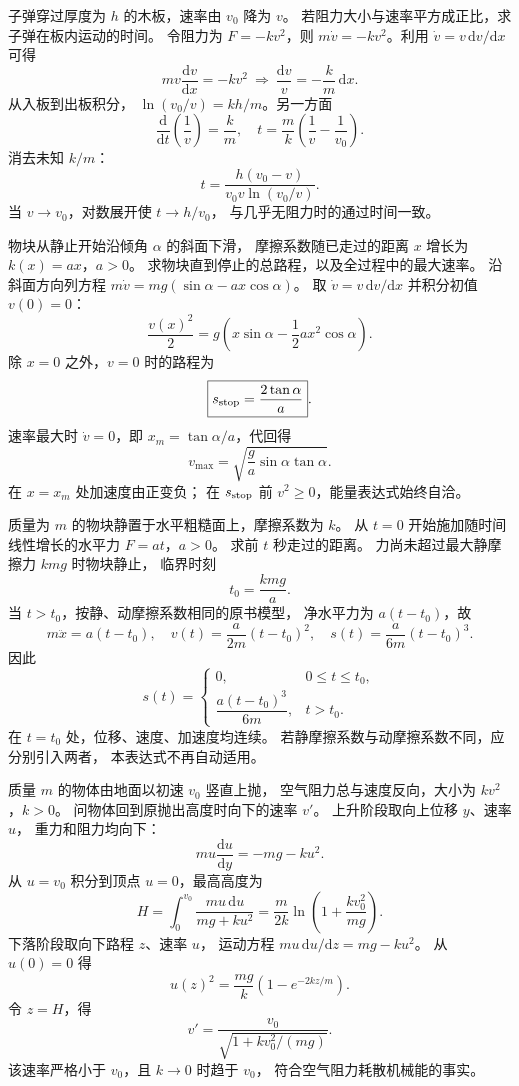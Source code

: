 子弹穿过厚度为 $h$ 的木板，速率由 $v_0$ 降为 $v$。
若阻力大小与速率平方成正比，求子弹在板内运动的时间。
\exsolution
令阻力为 $F=-kv^2$，则
$m\dot v=-kv^2$。利用
$\dot v=v\,\mathrm dv/\mathrm dx$ 可得
\[
m v\frac{\mathrm dv}{\mathrm dx}=-kv^2
\ \Longrightarrow\
\frac{\mathrm dv}{v}=-\frac km\,\mathrm dx.
\]
从入板到出板积分，
$\ln(v_0/v)=kh/m$。另一方面
\[
\frac{\mathrm d}{\mathrm dt}\left(\frac1v\right)=\frac km,
\quad
t=\frac mk\left(\frac1v-\frac1{v_0}\right).
\]
消去未知 $k/m$：
\[
\boxed{t=\frac{h(v_0-v)}
 {v_0v\ln(v_0/v)}}.
\]
\excheck 当 $v\to v_0$，对数展开使 $t\to h/v_0$，
与几乎无阻力时的通过时间一致。

物块从静止开始沿倾角 $\alpha$ 的斜面下滑，
摩擦系数随已走过的距离 $x$ 增长为 $k(x)=ax$，$a>0$。
求物块直到停止的总路程，以及全过程中的最大速率。
\exsolution
沿斜面方向列方程
$m\dot v=mg(\sin\alpha-ax\cos\alpha)$。
取 $\dot v=v\,\mathrm dv/\mathrm dx$ 并积分初值 $v(0)=0$：
\[
\frac{v(x)^2}{2}
=g\left(x\sin\alpha-\frac12ax^2\cos\alpha\right).
\]
除 $x=0$ 之外，$v=0$ 时的路程为
\[
\boxed{s_{\rm stop}=\frac{2\tan\alpha}{a}}.
\]
速率最大时 $\dot v=0$，即
$x_m=\tan\alpha/a$，代回得
\[
\boxed{v_{\max}=
\sqrt{\frac ga\sin\alpha\tan\alpha}}.
\]
\excheck 在 $x=x_m$ 处加速度由正变负；
在 $s_{\rm stop}$ 前 $v^2\ge0$，能量表达式始终自洽。

质量为 $m$ 的物块静置于水平粗糙面上，摩擦系数为 $k$。
从 $t=0$ 开始施加随时间线性增长的水平力 $F=at$，$a>0$。
求前 $t$ 秒走过的距离。
\exsolution
力尚未超过最大静摩擦力 $kmg$ 时物块静止，
临界时刻
\[
t_0=\frac{kmg}{a}.
\]
当 $t>t_0$，按静、动摩擦系数相同的原书模型，
净水平力为 $a(t-t_0)$，故
\[
m\ddot x=a(t-t_0),\quad
v(t)=\frac{a}{2m}(t-t_0)^2,\quad
s(t)=\frac{a}{6m}(t-t_0)^3.
\]
因此
\[
\boxed{s(t)=
\begin{cases}
0,&0\le t\le t_0,\\[2pt]
\dfrac{a(t-t_0)^3}{6m},&t>t_0.
\end{cases}}
\]
\excheck 在 $t=t_0$ 处，位移、速度、加速度均连续。
若静摩擦系数与动摩擦系数不同，应分别引入两者，
本表达式不再自动适用。

质量 $m$ 的物体由地面以初速 $v_0$ 竖直上抛，
空气阻力总与速度反向，大小为 $kv^2$，$k>0$。
问物体回到原抛出高度时向下的速率 $v'$。
\exsolution
上升阶段取向上位移 $y$、速率 $u$，
重力和阻力均向下：
\[
m u\frac{\mathrm du}{\mathrm dy}=-mg-ku^2.
\]
从 $u=v_0$ 积分到顶点 $u=0$，最高高度为
\[
H=\int_0^{v_0}\frac{mu\,\mathrm du}{mg+ku^2}
=\frac{m}{2k}\ln\left(1+\frac{kv_0^2}{mg}\right).
\]
下落阶段取向下路程 $z$、速率 $u$，
运动方程 $m u\,\mathrm du/\mathrm dz=mg-ku^2$。
从 $u(0)=0$ 得
\[
u(z)^2=\frac{mg}{k}\left(1-e^{-2kz/m}\right).
\]
令 $z=H$，得
\[
\boxed{v'=\frac{v_0}{\sqrt{1+kv_0^2/(mg)}}}.
\]
\excheck 该速率严格小于 $v_0$，且 $k\to0$ 时趋于 $v_0$，
符合空气阻力耗散机械能的事实。

